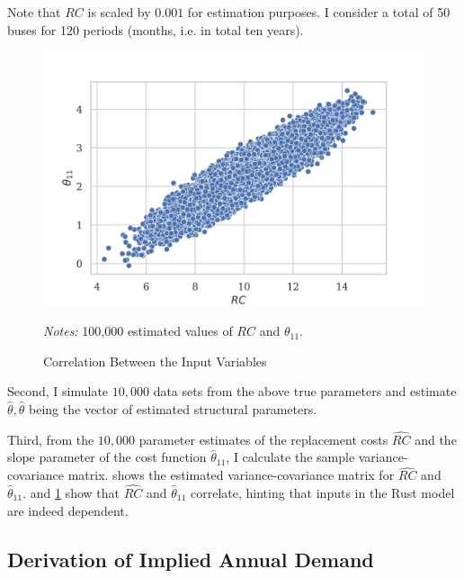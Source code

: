 \noindent Note that $RC$ is scaled by $0.001$ for estimation purposes. I consider a total of 50 buses for 120 periods (months, i.e. in total ten years).

\begin{figure}[t]
	\caption{Correlation Between the Input Variables}
    \label{correlation}
	\centering
	\vspace*{-4mm}
	\begin{centering}
	\includegraphics[scale=0.9]{../figures/correlation_rc_theta.png}
	\end{centering}

	\small
	\textit{Notes:} 100,000 estimated values of $RC$ and $\theta_{11}$.

\end{figure}


Second, I simulate $10,000$ data sets from the above true parameters and estimate $\hat{\theta}, \hat{\theta}$ being the vector of estimated structural parameters.

Third, from the $10,000$ parameter estimates of the replacement costs $\widehat{RC}$ and the slope parameter of the cost function ${\hat{\theta}}_{11}$, I calculate the sample variance-covariance matrix.  shows the estimated variance-covariance matrix for $\widehat{RC}$ and ${\hat{\theta}}_{11}$.  and \cref{correlation} show that $\widehat{RC}$ and ${\hat{\theta}}_{11}$ correlate, hinting that inputs in the Rust model are indeed dependent.

\subsection{Derivation of Implied Annual Demand}


